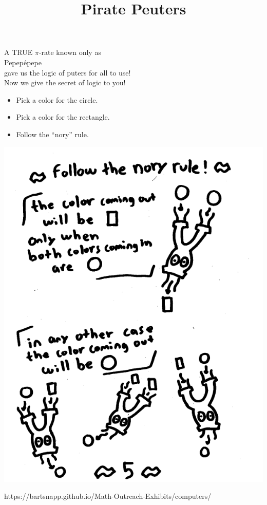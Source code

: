 \documentclass{../exhibit}
\title{Pirate Peuters}
\begin{document}
\begin{context}

  A TRUE $\pi$-rate known only as\\
   \hspace{1.5in}Pepep\'epepe\\
  gave us the logic of puters for all to use!\\[1cm]

  Now we give the secret of logic to you!
  
\end{context}

\begin{directions}
  \begin{itemize}
  \item Pick a color for the circle.
  \item Pick a color for the rectangle.
    \item Follow the ``nory'' rule.
  \end{itemize}
\end{directions}

  \begin{example}
    \begin{center}
      \includegraphics[height=.4\textheight]{nory.png}
    \end{center}
\end{example}

\begin{mathConnections}
  https://bartsnapp.github.io/Math-Outreach-Exhibits/computers/
\end{mathConnections}
\end{document}
